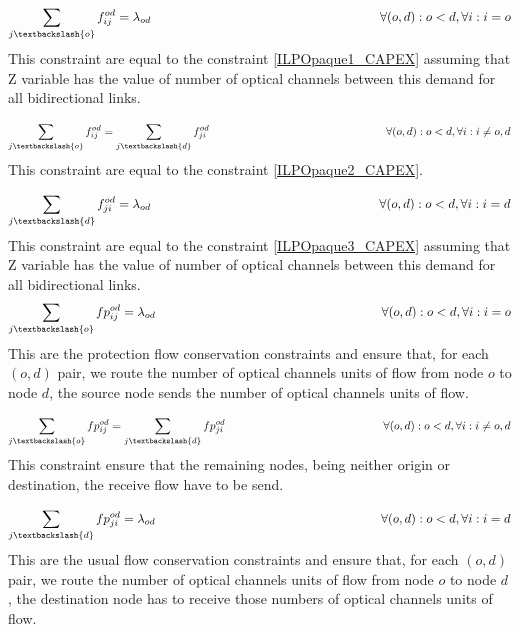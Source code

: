 \begin{equation}
\sum_{j\textbackslash \{o\}} f_{ij}^{od} = \lambda_{od} \qquad \qquad \qquad \qquad \qquad \qquad \qquad \qquad \qquad
\forall(o,d) : o < d, \forall i: i = o
\label{ILPTransp1}
\end{equation}
\noindent
This constraint are equal to the constraint \ref{ILPOpaque1_CAPEX} assuming that Z variable has the value of number of optical channels between this demand for all bidirectional links.

\begin{equation}
\sum_{j\textbackslash \{o\}} f_{ij}^{od} = \sum_{j\textbackslash \{d\}} f_{ji}^{od} \qquad \qquad \qquad \qquad \qquad \qquad \qquad \qquad
\forall(o,d) : o < d, \forall i: i \neq o,d
\label{ILPTransp2}
\end{equation}
\noindent
This constraint are equal to the constraint \ref{ILPOpaque2_CAPEX}.

\begin{equation}
\sum_{j\textbackslash \{d\}} f_{ji}^{od} = \lambda_{od}  \qquad \qquad \qquad \qquad \qquad \qquad \qquad \qquad \qquad
\forall(o,d) : o < d, \forall i: i = d
\label{ILPTransp3}
\end{equation}
\noindent
This constraint are equal to the constraint \ref{ILPOpaque3_CAPEX} assuming that Z variable has the value of number of optical channels between this demand for all bidirectional links.
\newpage
\begin{equation}
\sum_{j\textbackslash \{o\}} fp_{ij}^{od} = \lambda_{od} \qquad \qquad \qquad \qquad \qquad \qquad \qquad \qquad \qquad
\forall(o,d) : o < d, \forall i: i = o
\label{ILPTransp1p}
\end{equation}
\noindent
This are the protection flow conservation constraints and ensure that, for each $(o,d)$ pair, we route the number of optical channels units of flow from node $o$ to node $d$, the source node sends the number of optical channels units of flow.

\begin{equation}
\sum_{j\textbackslash \{o\}} fp_{ij}^{od} = \sum_{j\textbackslash \{d\}} fp_{ji}^{od} \qquad \qquad \qquad \qquad \qquad \qquad \qquad
\forall(o,d) : o < d, \forall i: i \neq o,d
\label{ILPTransp2p}
\end{equation}
\noindent
This constraint ensure that the remaining nodes, being neither origin or destination, the receive flow have to be send.

\begin{equation}
\sum_{j\textbackslash \{d\}} fp_{ji}^{od} = \lambda_{od} \qquad \qquad \qquad \qquad \qquad \qquad \qquad \qquad \qquad
\forall(o,d) : o < d, \forall i: i = d
\label{ILPTransp3p}
\end{equation}
\noindent
This are the usual flow conservation constraints and ensure that, for each $(o,d)$ pair, we route the number of optical channels units of flow from node $o$ to node $d$, the destination node has to receive those numbers of optical channels units of flow.


